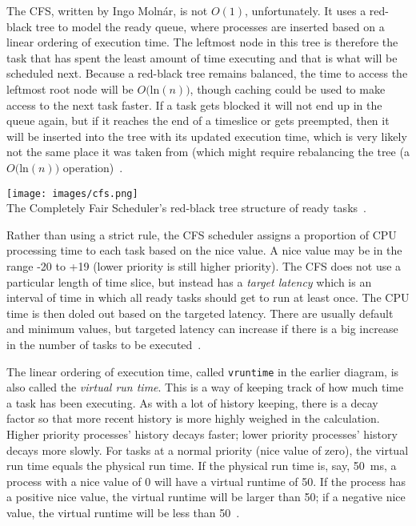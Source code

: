 The CFS, written by Ingo Moln\'ar, is not $O(1)$, unfortunately. It uses a red-black tree to model the ready queue, where processes are inserted based on a linear ordering of execution time. The leftmost node in this tree is therefore the task that has spent the least amount of time executing and that is what will be scheduled next. Because a red-black tree remains balanced, the time to access the leftmost root node will be $O($ln$(n))$, though caching could be used to make access to the next task faster. If a task gets blocked it will not end up in the queue again, but if it reaches the end of a timeslice or gets preempted, then it will be inserted into the tree with its updated execution time, which is very likely not the same place it was taken from (which might require rebalancing the tree (a $O($ln$(n))$ operation)~\cite{mte241}.

\begin{center}
	\texttt{[image: images/cfs.png]}\\
	The Completely Fair Scheduler's red-black tree structure of ready tasks~\cite{osc}.
\end{center}

Rather than using a strict rule, the CFS scheduler assigns a proportion of CPU processing time to each task based on the nice value. A nice value may be in the range -20 to +19 (lower priority is still higher priority). The CFS does not use a particular length of time slice, but instead has a \textit{target latency} which is an interval of time in which all ready tasks should get to run at least once. The CPU time is then doled out based on the targeted latency. There are usually default and minimum values, but targeted latency can increase if there is a big increase in the number of tasks to be executed~\cite{osc}.

The linear ordering of execution time, called \texttt{vruntime} in the earlier diagram, is also called the \textit{virtual run time}. This is a way of keeping track of how much time a task has been executing. As with a lot of history keeping, there is a decay factor  so that more recent history is more highly weighed in the calculation. Higher priority processes' history decays faster; lower priority processes' history decays more slowly. For tasks at a normal priority (nice value of zero), the virtual run time equals the physical run time. If the physical run time is, say, 50~ms, a process with a nice value of 0 will have a virtual runtime of 50. If the process has a positive nice value, the virtual runtime will be larger than 50; if a negative nice value, the virtual runtime will be less than 50~\cite{osc}.


